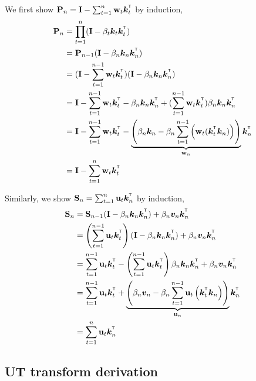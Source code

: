 We first show $\rmP_n = \rmI - \sum_{t=1}^n \vw_t\vk_t^{\intercal}$ by induction,
\begin{align*}
\rmP_n &= \prod_{t=1}^n(\rmI - \beta_t \vk_t \vk_t^\intercal)     \\
&= \rmP_{n-1} (\rmI - \beta_n \vk_n \vk_n^\intercal)  \\
&=  (\rmI - \sum_{t=1}^{n-1} \vw_t \vk_t^\intercal)  (\rmI - \beta_n \vk_n \vk_n^\intercal) \\
&=  \rmI - \sum_{t=1}^{n-1} \vw_t \vk_t^\intercal - \beta_n \vk_n \vk_n^\intercal + (\sum_{t=1}^{n-1} \vw_t \vk_t^\intercal) \beta_n \vk_n \vk_n^\intercal \\
&= \rmI - \sum_{t=1}^{n-1} \vw_t \vk_t^\intercal  - \underbrace{\left(\beta_n \vk_n - \beta_n \sum_{t=1}^{n-1} \left(\vw_t (\vk_t^\intercal\vk_n)\right) \right)}_{\vw_n}\vk_n^\intercal \\
&= \rmI - \sum_{t=1}^n \vw_t\vk_t^{\intercal}
\end{align*}

Similarly, we show $\rmS_n = \sum_{t=1}^{n} \vu_t \vk_n^\intercal$ by induction, 
\begin{align*}
    \rmS_n & = \rmS_{n-1} (\rmI - \beta_n \vk_n\vk_n^\intercal) + \beta_n \vv_n  \vk_n^\intercal \\
    & =  \left(\sum_{t=1}^{n-1} \vu_{t}\vk_{t}^\intercal\right) (\rmI - \beta_n \vk_n\vk_n^\intercal )  + \beta_n \vv_n  \vk_n^\intercal \\
    &= \sum_{t=1}^{n-1} \vu_{t}\vk_{t}^\intercal - \left(\sum_{t=1}^{n-1} \vu_{t}\vk_{t}^\intercal\right) \beta_n \vk_n \vk_n^\intercal + \beta_n \vv_n \vk_n^\intercal \\
    &= \sum_{t=1}^{n-1} \vu_{t}\vk_{t}^\intercal + \underbrace{\left(\beta_n \vv_n - \beta_n\sum_{t=1}^{n-1} \vu_t \left(\vk_t^{\intercal} \vk_n \right)  \right)}_{\vu_n} \vk_n^{\intercal} \\
    &= \sum_{t=1}^{n} \vu_t \vk_n^\intercal
    \label{eq:wy_s_final}
\end{align*}

\subsection{UT transform derivation} 


